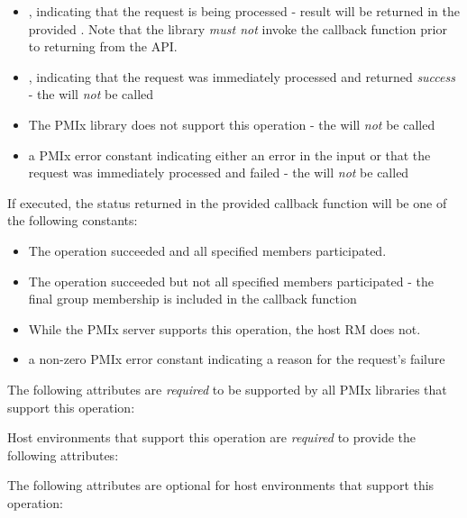 \begin{itemize}
    \item {}, indicating that the request is being processed - result will be returned in the provided . Note that the library \emph{must not} invoke the callback function prior to returning from the \ac{API}.
    \item {}, indicating that the request was immediately processed and returned \textit{success} - the  will \textit{not} be called
    \item {} The \ac{PMIx} library does not support this operation - the  will \textit{not} be called
    \item a PMIx error constant indicating either an error in the input or that the request was immediately processed and failed - the  will \textit{not} be called
\end{itemize}

If executed, the status returned in the provided callback function will be one of the following constants:

\begin{itemize}
\item {} The operation succeeded and all specified members participated.
\item {} The operation succeeded but not all specified members participated - the final group membership is included in the callback function
\item {} While the \ac{PMIx} server supports this operation, the host \ac{RM} does not.
\item a non-zero \ac{PMIx} error constant indicating a reason for the request's failure
\end{itemize}

\reqattrstart
The following attributes are \textit{required} to be supported by all \ac{PMIx} libraries that support this operation:


Host environments that support this operation are \textit{required} to provide the following attributes:


\reqattrend

\optattrstart
The following attributes are optional for host environments that support this operation:

